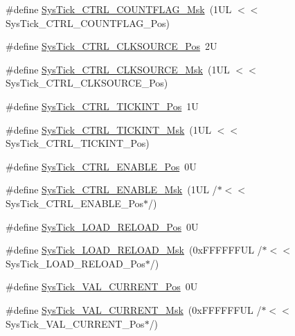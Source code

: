 \begin{DoxyCompactItemize}
\item 
\#define \hyperlink{group___c_m_s_i_s___sys_tick_ga1bf3033ecccf200f59baefe15dbb367c}{Sys\-Tick\-\_\-\-C\-T\-R\-L\-\_\-\-C\-O\-U\-N\-T\-F\-L\-A\-G\-\_\-\-Msk}~(1\-U\-L $<$$<$ Sys\-Tick\-\_\-\-C\-T\-R\-L\-\_\-\-C\-O\-U\-N\-T\-F\-L\-A\-G\-\_\-\-Pos)
\item 
\#define \hyperlink{group___c_m_s_i_s___sys_tick_ga24fbc69a5f0b78d67fda2300257baff1}{Sys\-Tick\-\_\-\-C\-T\-R\-L\-\_\-\-C\-L\-K\-S\-O\-U\-R\-C\-E\-\_\-\-Pos}~2\-U
\item 
\#define \hyperlink{group___c_m_s_i_s___sys_tick_gaa41d06039797423a46596bd313d57373}{Sys\-Tick\-\_\-\-C\-T\-R\-L\-\_\-\-C\-L\-K\-S\-O\-U\-R\-C\-E\-\_\-\-Msk}~(1\-U\-L $<$$<$ Sys\-Tick\-\_\-\-C\-T\-R\-L\-\_\-\-C\-L\-K\-S\-O\-U\-R\-C\-E\-\_\-\-Pos)
\item 
\#define \hyperlink{group___c_m_s_i_s___sys_tick_ga88f45bbb89ce8df3cd2b2613c7b48214}{Sys\-Tick\-\_\-\-C\-T\-R\-L\-\_\-\-T\-I\-C\-K\-I\-N\-T\-\_\-\-Pos}~1\-U
\item 
\#define \hyperlink{group___c_m_s_i_s___sys_tick_ga95bb984266ca764024836a870238a027}{Sys\-Tick\-\_\-\-C\-T\-R\-L\-\_\-\-T\-I\-C\-K\-I\-N\-T\-\_\-\-Msk}~(1\-U\-L $<$$<$ Sys\-Tick\-\_\-\-C\-T\-R\-L\-\_\-\-T\-I\-C\-K\-I\-N\-T\-\_\-\-Pos)
\item 
\#define \hyperlink{group___c_m_s_i_s___sys_tick_ga0b48cc1e36d92a92e4bf632890314810}{Sys\-Tick\-\_\-\-C\-T\-R\-L\-\_\-\-E\-N\-A\-B\-L\-E\-\_\-\-Pos}~0\-U
\item 
\#define \hyperlink{group___c_m_s_i_s___sys_tick_ga16c9fee0ed0235524bdeb38af328fd1f}{Sys\-Tick\-\_\-\-C\-T\-R\-L\-\_\-\-E\-N\-A\-B\-L\-E\-\_\-\-Msk}~(1\-U\-L /$\ast$$<$$<$ Sys\-Tick\-\_\-\-C\-T\-R\-L\-\_\-\-E\-N\-A\-B\-L\-E\-\_\-\-Pos$\ast$/)
\item 
\#define \hyperlink{group___c_m_s_i_s___sys_tick_gaf44d10df359dc5bf5752b0894ae3bad2}{Sys\-Tick\-\_\-\-L\-O\-A\-D\-\_\-\-R\-E\-L\-O\-A\-D\-\_\-\-Pos}~0\-U
\item 
\#define \hyperlink{group___c_m_s_i_s___sys_tick_ga265912a7962f0e1abd170336e579b1b1}{Sys\-Tick\-\_\-\-L\-O\-A\-D\-\_\-\-R\-E\-L\-O\-A\-D\-\_\-\-Msk}~(0x\-F\-F\-F\-F\-F\-F\-U\-L /$\ast$$<$$<$ Sys\-Tick\-\_\-\-L\-O\-A\-D\-\_\-\-R\-E\-L\-O\-A\-D\-\_\-\-Pos$\ast$/)
\item 
\#define \hyperlink{group___c_m_s_i_s___sys_tick_ga3208104c3b019b5de35ae8c21d5c34dd}{Sys\-Tick\-\_\-\-V\-A\-L\-\_\-\-C\-U\-R\-R\-E\-N\-T\-\_\-\-Pos}~0\-U
\item 
\#define \hyperlink{group___c_m_s_i_s___sys_tick_gafc77b56d568930b49a2474debc75ab45}{Sys\-Tick\-\_\-\-V\-A\-L\-\_\-\-C\-U\-R\-R\-E\-N\-T\-\_\-\-Msk}~(0x\-F\-F\-F\-F\-F\-F\-U\-L /$\ast$$<$$<$ Sys\-Tick\-\_\-\-V\-A\-L\-\_\-\-C\-U\-R\-R\-E\-N\-T\-\_\-\-Pos$\ast$/)
$$
\end{DoxyCompactItemize}
